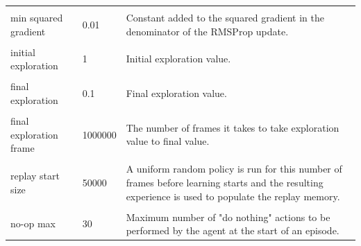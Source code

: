 \documentclass[10pt]{article}
\begin{document}
\begin{table}[h]
\begin{tabular}{p{3cm} l p{8cm}}
 & & \\
min squared gradient & 0.01 & Constant added to the squared gradient in the denominator of the RMSProp update.\\
 & & \\
initial exploration & 1 & Initial exploration value.\\
 & & \\
final exploration & 0.1 & Final exploration value.\\
 & & \\
final exploration frame & 1000000 & The number of frames it takes to take exploration value to final value.\\
 & & \\
replay start size & 50000 & A uniform random policy is run for this number of frames before learning starts and the resulting experience is used to populate the replay memory.\\
 & & \\
no-op max & 30 & Maximum number of "do nothing" actions to be performed by the agent at the start of an episode.                                                    
\end{tabular}
\end{table}
\newpage
\end{document}
